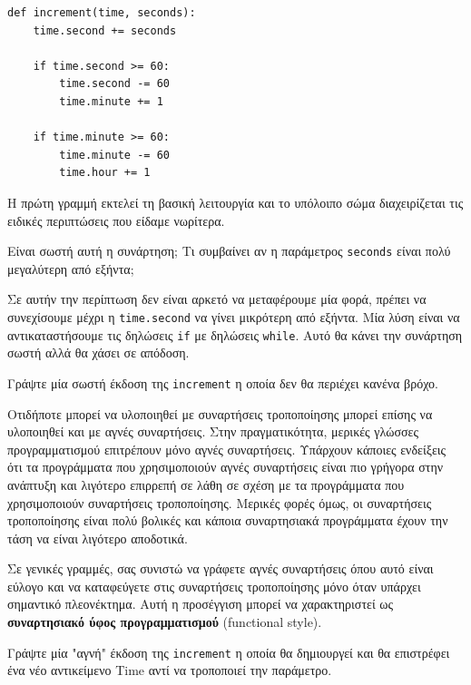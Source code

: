 \documentclass[10pt]{book}
\begin{document}
\begin{verbatim}
def increment(time, seconds):
    time.second += seconds

    if time.second >= 60:
        time.second -= 60
        time.minute += 1

    if time.minute >= 60:
        time.minute -= 60
        time.hour += 1
\end{verbatim}
%
Η πρώτη γραμμή εκτελεί τη βασική λειτουργία και το υπόλοιπο σώμα διαχειρίζεται τις ειδικές περιπτώσεις που
είδαμε νωρίτερα.

Είναι σωστή αυτή η συνάρτηση; Τι συμβαίνει αν η παράμετρος {\tt seconds} είναι πολύ μεγαλύτερη από εξήντα;

Σε αυτήν την περίπτωση δεν είναι αρκετό να μεταφέρουμε μία φορά, πρέπει να συνεχίσουμε μέχρι η {\tt time.second}
να γίνει μικρότερη από εξήντα. Μία λύση είναι να αντικαταστήσουμε τις δηλώσεις {\tt if} με δηλώσεις {\tt while}.
Αυτό θα κάνει την συνάρτηση σωστή αλλά θα χάσει σε απόδοση.
\\
\begin{exercise}

Γράψτε μία σωστή έκδοση της {\tt increment} η οποία δεν θα περιέχει κανένα βρόχο.

\end{exercise}

Οτιδήποτε μπορεί να υλοποιηθεί με συναρτήσεις τροποποίησης μπορεί επίσης να υλοποιηθεί και με αγνές συναρτήσεις.
Στην πραγματικότητα, μερικές γλώσσες προγραμματισμού επιτρέπουν μόνο αγνές συναρτήσεις. Υπάρχουν κάποιες ενδείξεις
ότι τα προγράμματα που χρησιμοποιούν αγνές συναρτήσεις είναι πιο γρήγορα στην ανάπτυξη και λιγότερο επιρρεπή
σε λάθη σε σχέση με τα προγράμματα που χρησιμοποιούν συναρτήσεις τροποποίησης. Μερικές φορές όμως, οι συναρτήσεις
τροποποίησης είναι πολύ βολικές και κάποια συναρτησιακά προγράμματα έχουν την τάση να είναι λιγότερο αποδοτικά.

Σε γενικές γραμμές, σας συνιστώ να γράφετε αγνές συναρτήσεις όπου αυτό είναι εύλογο και να καταφεύγετε στις
συναρτήσεις τροποποίησης μόνο όταν υπάρχει σημαντικό πλεονέκτημα. Αυτή η προσέγγιση μπορεί να χαρακτηριστεί ως
{\bf συναρτησιακό ύφος προγραμματισμού} (functional style). 
\\


\begin{exercise}

Γράψτε μία "αγνή" έκδοση της {\tt increment} η οποία θα δημιουργεί και θα επιστρέφει ένα νέο
αντικείμενο Time αντί να τροποποιεί την παράμετρο.
\end{exercise}
\end{document}

